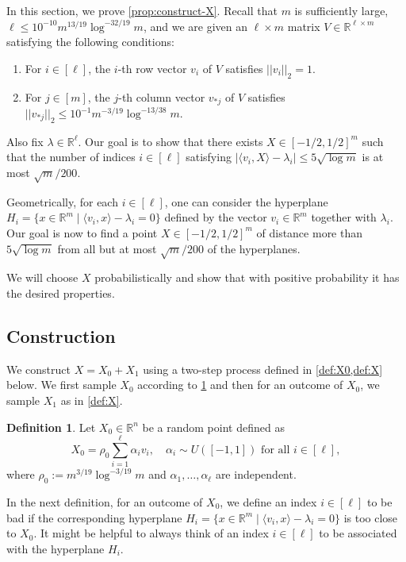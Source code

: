\documentclass[reqno]{amsart}
\theoremstyle{remark}
\theoremstyle{definition}
\newtheorem{definition}[theorem]{Definition}
\numberwithin{theorem}{section}
\renewcommand{\(}{\bigl(}
\renewcommand{\)}{\bigr)\vphantom{)}}
\renewcommand{\le}{\leqslant}
\newcommand{\R}{\mathbb R}
\newcommand{\ang}[1]{\langle#1\rangle}
\newcommand{\unif}{U([-1,1])}
\begin{document}
In this section, we prove \cref{prop:construct-X}. Recall that $m$ is sufficiently large, $\ell\le 10^{-10}m^{13/19}\log^{-32/19}m$, and we are given an $\ell\times m$ matrix $V\in \R^{\ell \times m}$ satisfying the following conditions:
\begin{enumerate}
    \item For $i\in [\ell]$, the $i$-th row vector $v_i$ of $V$ satisfies $||v_i||_2 = 1$.
    \item For $j\in [m]$, the $j$-th column vector $v_{*j}$ of $V$ satisfies $||v_{*j}||_2\le 10^{-1}m^{-3/19}\log^{-13/38}m$.
\end{enumerate}
Also fix $\lambda\in \R^\ell$. Our goal is to show that there exists $X\in [-1/2, 1/2]^m$ such that the number of indices $i\in [\ell]$ satisfying $|\ang{v_i,X}-\lambda_i| \le 5\sqrt{\log m}$ is at most $\sqrt{m}/200$.

Geometrically, for each $i\in [\ell]$, one can consider the hyperplane $H_i = \{x\in \R^m\mid \ang{v_i,x}-\lambda_i = 0\}$ defined by the vector $v_i\in \R^m$ together with $\lambda_i$. Our goal is now to find a point $X\in [-1/2, 1/2]^m$ of  distance more than $5\sqrt{\log m}$ from all but at most $\sqrt{m}/200$ of the hyperplanes.

We will choose $X$ probabilistically and show that with positive probability it has the desired properties.

\subsection{Construction}

We construct $X = X_0+X_1$ using a two-step process defined in \cref{def:X0,def:X} below. We first sample $X_0$ according to \cref{def:X0} and then for an outcome of $X_0$, we sample $X_1$ as in \cref{def:X}.

\begin{definition}\label{def:X0}
Let $X_0\in \R^n$ be a random point defined as 
\[X_0 = \rho_0\sum_{i = 1}^\ell \alpha_i v_i, \quad \alpha_i\sim \unif\text{ for all $i\in [\ell]$},\]
where $\rho_0:= m^{3/19}\log^{-3/19}m$ and $\alpha_1,\dots,\alpha_\ell$ are independent. 
\end{definition}

In the next definition, for an outcome of $X_0$, we define an index $i\in [\ell]$ to be bad if the corresponding hyperplane $H_i = \{x\in \R^m\mid \ang{v_i,x}-\lambda_i = 0\}$ is too close to $X_0$.
It might be helpful to always think of an index $i\in [\ell]$ to be associated with the hyperplane $H_i$.
\end{document}
